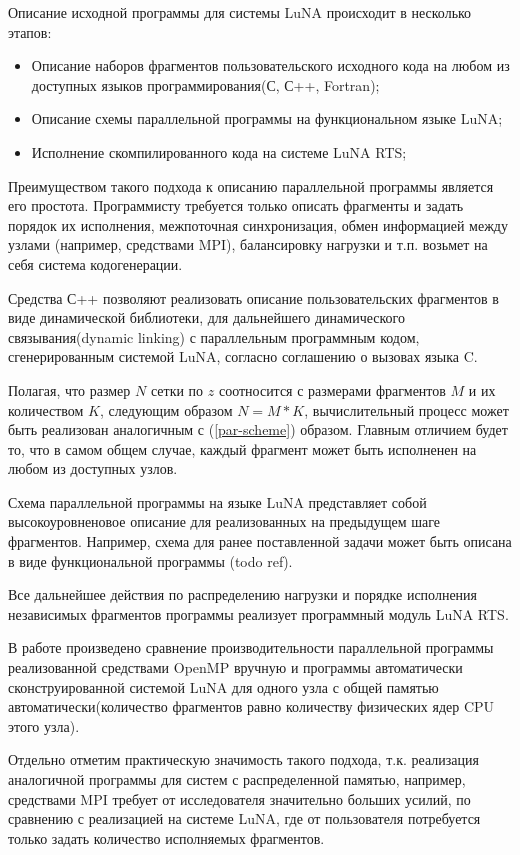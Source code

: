 Описание исходной программы для системы LuNA происходит в несколько этапов:

\begin{itemize}
    \item Описание наборов фрагментов пользовательского исходного кода
на любом из доступных языков программирования(С, С++, Fortran);
    \item Описание схемы параллельной программы на функциональном языке LuNA;
    \item Исполнение скомпилированного кода на системе LuNA RTS;
\end{itemize}

Преимуществом такого подхода к описанию параллельной программы является его простота. Программисту
требуется только описать фрагменты и задать порядок их исполнения, межпоточная синхронизация, обмен информацией между узлами
(например, средствами MPI), балансировку нагрузки и т.п. возьмет на себя система кодогенерации.

Средства С++ позволяют реализовать описание пользовательских фрагментов в виде динамической библиотеки,
для дальнейшего динамического связывания(dynamic linking) с параллельным программным кодом, сгенерированным системой LuNA,
согласно соглашению о вызовах языка C.

Полагая, что размер $N$ сетки по $z$ соотносится с размерами фрагментов $M$ и их количеством $K$,
следующим образом $N = M * K$, вычислительный процесс может быть реализован аналогичным с (\ref{par-scheme}) образом.
Главным отличием будет то, что в самом общем случае, каждый фрагмент может быть исполненен на любом из доступных узлов.

Схема параллельной программы на языке LuNA представляет собой высокоуровненовое описание для реализованных на предыдущем шаге фрагментов.
Например, схема для ранее поставленной задачи может быть описана в виде функциональной программы (todo ref).

Все дальнейшее действия по распределению нагрузки и порядке исполнения независимых фрагментов программы реализует
программный модуль LuNA RTS.

В работе произведено сравнение производительности параллельной программы реализованной средствами OpenMP вручную
и программы автоматически сконструированной системой LuNA для одного узла с общей памятью автоматически(количество фрагментов
равно количеству физических ядер CPU этого узла).

Отдельно отметим практическую значимость такого подхода, т.к. реализация аналогичной программы для систем с распределенной памятью,
например, средствами MPI требует от исследователя значительно больших усилий, по сравнению с реализацией на системе LuNA,
где от пользователя потребуется только задать количество исполняемых фрагментов.

